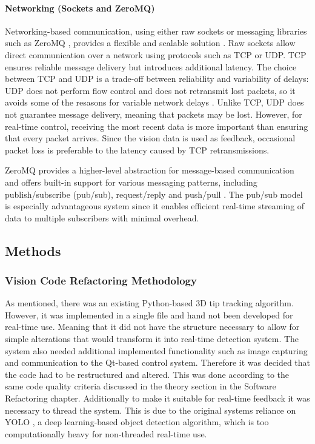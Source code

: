 \paragraph*{Networking (Sockets and ZeroMQ)}
Networking-based communication, using either raw sockets or messaging libraries such as ZeroMQ \cite{noauthor_zeromq_nodate}, provides a flexible and scalable solution \cite{lauener_how_2018}. Raw sockets allow direct communication over a network using protocols such as TCP or UDP. TCP ensures reliable message delivery but introduces additional latency. The choice between TCP and UDP is a trade-off between reliability and variability of delays: UDP does not perform flow control and does not retransmit lost packets, so it avoids some of the resasons for variable network delays \cite{kleppmann_designing_2017}. Unlike TCP, UDP does not guarantee message delivery, meaning that packets may be lost.  However, for real-time control, receiving the most recent data is more important than ensuring that every packet arrives. Since the vision data is used as feedback, occasional packet loss is preferable to the latency caused by TCP retransmissions. 

ZeroMQ provides a higher-level abstraction for message-based communication and offers built-in support for various messaging patterns, including publish/subscribe (pub/sub), request/reply and push/pull \cite{lauener_how_2018}. The pub/sub model is especially advantageous system since it enables efficient real-time streaming of data to multiple subscribers with minimal overhead. 


\subsection{Methods}

\subsubsection{Vision Code Refactoring Methodology}
As mentioned, there was an existing Python-based 3D tip tracking algorithm. However, it was implemented in a single file and hand not been developed for real-time use. Meaning that it did not have the structure necessary to allow for simple alterations that would transform it into real-time detection system. The system also needed additional implemented functionality such as image capturing and communication to the Qt-based control system. Therefore it was decided that the code had to be restructured and altered. This was done according to the same code quality criteria discussed in the theory section in the Software Refactoring chapter.
\newline \newline
Additionally to make it suitable for real-time feedback it was necessary to thread the system. This is due to the original systems reliance on YOLO \cite{redmon_you_2016}, a deep learning-based object detection algorithm, which is too computationally heavy for non-threaded real-time use.

